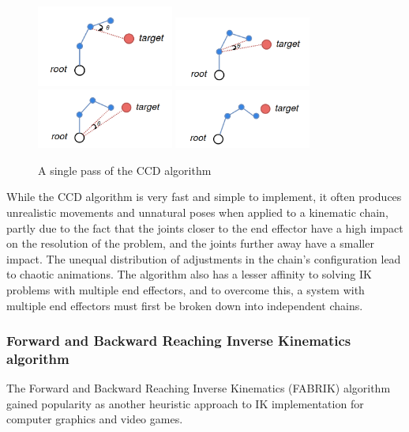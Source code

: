 \begin{figure}
    \centering
    \captionsetup{justification=centering}
    \includegraphics[width=0.4\textwidth]{grafika/ccd_1}
    \includegraphics[width=0.4\textwidth]{grafika/ccd_2}
    \includegraphics[width=0.4\textwidth]{grafika/ccd_3}
    \includegraphics[width=0.4\textwidth]{grafika/ccd_4}
    \caption{A single pass of the CCD algorithm}
    \label{fig:ccd}
\end{figure}

While the CCD algorithm is very fast and simple to implement, it often produces
unrealistic movements and unnatural poses when applied to a kinematic chain,
partly due to the fact that the joints closer to the end effector have a high
impact on the resolution of the problem, and the joints further away have
a smaller impact. The unequal distribution of adjustments in the chain's
configuration lead to chaotic animations. The algorithm also has a lesser
affinity to solving IK problems with multiple end effectors, and to overcome
this, a system with multiple end effectors must first be broken down into
independent chains.

\subsubsection{Forward and Backward Reaching Inverse Kinematics algorithm}
The Forward and Backward Reaching Inverse Kinematics (FABRIK) algorithm gained
popularity as another heuristic approach to IK implementation for computer
graphics and video games. 

